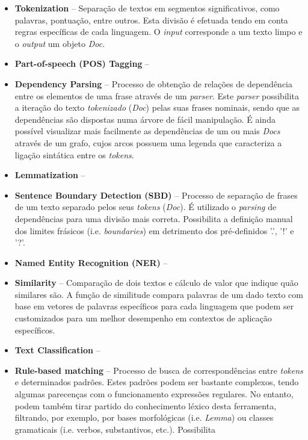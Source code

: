 \documentclass[12pt]{article}
\begin{document}
\begin{itemize}
	\item \textbf{Tokenization} -- Separação de textos em segmentos significativos, como palavras, pontuação,  entre outros. Esta divisão é efetuada tendo em conta regras
								   específicas de cada linguagem. O \textit{input} corresponde a um texto limpo e o \textit{output} um objeto \textit{Doc}.
	\item \textbf{Part-of-speech (POS) Tagging} -- 
	\item \textbf{Dependency Parsing} -- Processo de obtenção de relações de dependência entre os elementos de uma frase através de um \textit{parser}. Este \textit{parser}
										 possibilita a iteração do texto \textit{tokenizado} (\textit{Doc}) pelas suas frases nominais, sendo que as dependências são dispostas numa
										 árvore de fácil manipulação. É ainda possível visualizar mais facilmente as dependências de um ou mais \textit{Docs} através de um grafo,
										 cujos arcos possuem uma legenda que caracteriza a ligação sintática entre os \textit{tokens}.
	\item \textbf{Lemmatization} --
	\item \textbf{Sentence Boundary Detection (SBD)} -- Processo de separação de frases de um texto separado pelos seus \textit{tokens} (\textit{Doc}). É utilizado o \textit{parsing}
														de dependências para uma divisão mais correta. Possibilita a definição manual dos limites frásicos (i.e. \textit{boundaries})
														em detrimento dos pré-definidos '.', '!' e '?'.
	\item \textbf{Named Entity Recognition (NER)} --
	\item \textbf{Similarity} -- Comparação de dois textos e cálculo de valor que indique quão similares são. A função de similitude compara palavras de um dado texto com base em
								 vetores de palavras específicos para cada linguagem que podem ser customizados para um melhor desempenho em contextos de aplicação específicos.
	\item \textbf{Text Classification} -- 
	\item \textbf{Rule-based matching} -- Processo de busca de correspondências entre \textit{tokens} e determinados padrões. Estes padrões podem ser bastante complexos, tendo
										  algumas parecenças com o funcionamento expressões regulares. No entanto, podem também tirar partido do conhecimento léxico desta ferramenta,
										  filtrando, por exemplo, por bases morfológicas (i.e. \textit{Lemma}) ou classes gramaticais (i.e. verbos, substantivos, etc.). Possibilita

\end{itemize}
\end{document}
